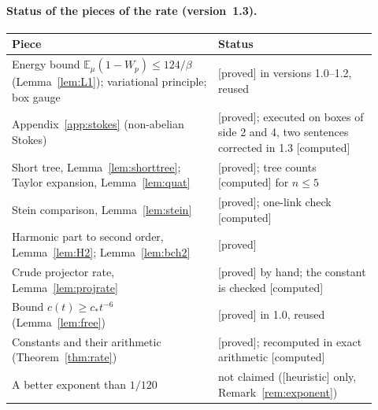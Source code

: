 \documentclass[11pt,a4paper]{article}
\theoremstyle{plain}
\theoremstyle{definition}
\theoremstyle{remark}
\numberwithin{equation}{section}
\newcommand{\E}{\mathbb{E}}
\newcommand{\st}[1]{\textsf{[#1]}}
\begin{document}
\paragraph{Status of the pieces of the rate (version~1.3).}
\begin{center}\small
\begin{tabular}{@{}p{0.52\linewidth}p{0.4\linewidth}@{}}
\toprule
Piece & Status\\\midrule
Energy bound $\E_\mu(1-W_p)\le124/\beta$ (Lemma~\ref{lem:L1}); variational principle; box gauge & \st{proved} in versions 1.0--1.2, reused\\
Appendix~\ref{app:stokes} (non-abelian Stokes) & \st{proved}; executed on boxes of side 2 and 4, two sentences corrected in 1.3 \st{computed}\\
Short tree, Lemma~\ref{lem:shorttree}; Taylor expansion, Lemma~\ref{lem:quat} & \st{proved}; tree counts \st{computed} for $n\le5$\\
Stein comparison, Lemma~\ref{lem:stein} & \st{proved}; one-link check \st{computed}\\
Harmonic part to second order, Lemma~\ref{lem:H2}; Lemma~\ref{lem:bch2} & \st{proved}\\
Crude projector rate, Lemma~\ref{lem:projrate} & \st{proved} by hand; the constant is checked \st{computed}\\
Bound $c(t)\ge c_*t^{-6}$ (Lemma~\ref{lem:free}) & \st{proved} in 1.0, reused\\
Constants and their arithmetic (Theorem~\ref{thm:rate}) & \st{proved}; recomputed in exact arithmetic \st{computed}\\
A better exponent than $1/120$ & not claimed (\st{heuristic} only, Remark~\ref{rem:exponent})\\
\bottomrule
\end{tabular}
\end{center}
\end{document}
